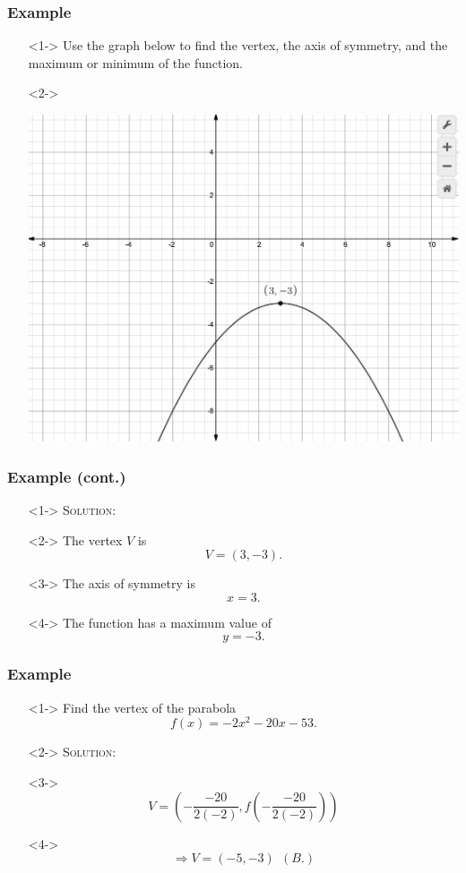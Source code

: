 \documentclass[handout]{beamer}
\begin{document}
\begin{frame}
	\frametitle{Example}
	\begin{enumerate}
		\item[]<1-> Use the graph below to find the vertex, the axis of symmetry, and the maximum or minimum of the function.
		\item[]<2->
			\begin{center}
				\includegraphics[scale=0.2]{3_3_10.png}
			\end{center}
	\end{enumerate}
\end{frame}

\begin{frame}
	\frametitle{Example (cont.)}
	\begin{enumerate}
		\item[]<1-> \textsc{Solution:}
		\item[]<2-> The vertex $V$ is
			\[
				V=(3,-3).
			\]
		\item[]<3-> The axis of symmetry is
		\[
			x=3.
		\]
		\item[]<4-> The function has a maximum value of
		\[
			y=-3.
		\]
	\end{enumerate}
\end{frame}

\begin{frame}
	\frametitle{Example}
	\begin{enumerate}
		\item[]<1-> Find the vertex of the parabola
			\[
				f(x)=-2x^{2}-20x-53.
			\]
		\item[]<2-> \textsc{Solution:}
		\item[]<3-> \[ V= \left( -\frac{-20}{2(-2)}, f \left( -\frac{-20}{2(-2)}\right) \right) \]
		\item[]<4-> \[ \Rightarrow V= (-5,-3) ~~(B.) \]
	\end{enumerate}
\end{frame}
\end{document}
